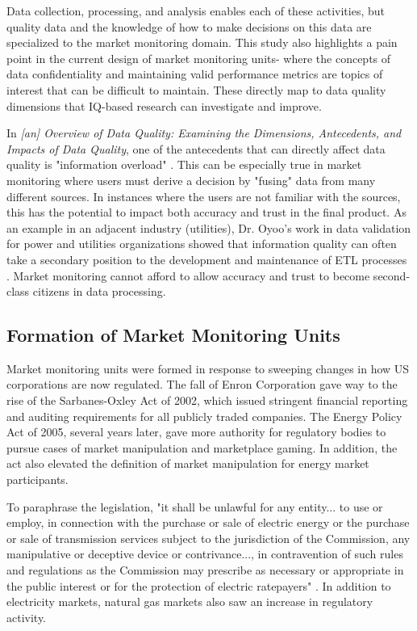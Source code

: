 Data collection, processing, and analysis enables each of these activities, but quality data and the knowledge of how to make decisions on this data are specialized to the market monitoring domain. This study also highlights a pain point in the current design of market monitoring units- where the concepts of data confidentiality and maintaining valid performance metrics are topics of interest that can be difficult to maintain. These directly map to data quality dimensions that IQ-based research can investigate and improve.

In \textit{[an] Overview of Data Quality: Examining the Dimensions, Antecedents, and Impacts of Data Quality}, one of the antecedents that can directly affect data quality is "information overload" \cite{wang-et-all}. This can be especially true in market monitoring where users must derive a decision by "fusing" data from many different sources. In instances where the users are not familiar with the sources, this has the potential to impact both accuracy and trust in the final product. As an example in an adjacent industry (utilities), Dr. Oyoo's work in data validation for power and utilities organizations showed that information quality can often take a secondary position to the development and maintenance of ETL processes \cite{oyoo}. Market monitoring cannot afford to allow accuracy and trust to become second-class citizens in data processing.

\subsection{Formation of Market Monitoring Units}

Market monitoring units were formed in response to sweeping changes in how US corporations are now regulated. The fall of Enron Corporation gave way to the rise of the Sarbanes-Oxley Act of 2002, which issued stringent financial reporting and auditing requirements for all publicly traded companies. The Energy Policy Act of 2005, several years later, gave more authority for regulatory bodies to pursue cases of market manipulation and marketplace gaming. In addition, the act also elevated the definition of market manipulation for energy market participants.

To paraphrase the legislation, "it shall be unlawful for any entity... to use or employ, in connection with the purchase or sale of electric energy or the purchase or sale of transmission services subject to the jurisdiction of the Commission, any manipulative or deceptive device or contrivance..., in contravention of such rules and regulations as the Commission may prescribe as necessary or appropriate in the public interest or for the protection of electric ratepayers" \cite{epa2005}. In addition to electricity markets, natural gas markets also saw an increase in regulatory activity.


